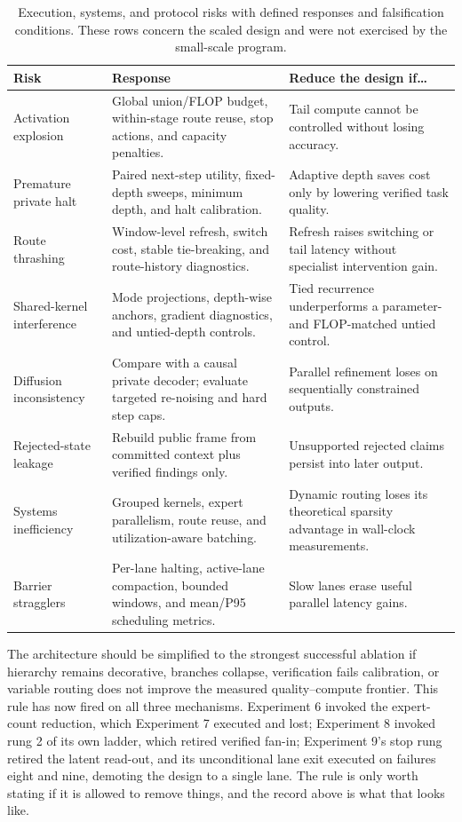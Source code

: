 \documentclass[10pt,a4paper]{article}
\begin{document}
\begin{table}[htbp]
\caption{Execution, systems, and protocol risks with defined responses and
falsification conditions. These rows concern the scaled design and were not
exercised by the small-scale program.}
\label{tab:failuremodessys}
\centering\footnotesize
\begin{tabularx}{\textwidth}{@{}>{\raggedright\arraybackslash}p{}XX@{}}
\toprule
\textbf{Risk} & \textbf{Response} & \textbf{Reduce the design if\ldots} \\
\midrule
Activation explosion & Global union/FLOP budget, within-stage route reuse, stop actions, and capacity penalties. & Tail compute cannot be controlled without losing accuracy. \\
Premature private halt & Paired next-step utility, fixed-depth sweeps, minimum depth, and halt calibration. & Adaptive depth saves cost only by lowering verified task quality. \\
Route thrashing & Window-level refresh, switch cost, stable tie-breaking, and route-history diagnostics. & Refresh raises switching or tail latency without specialist intervention gain. \\
Shared-kernel interference & Mode projections, depth-wise anchors, gradient diagnostics, and untied-depth controls. & Tied recurrence underperforms a parameter- and FLOP-matched untied control. \\
Diffusion inconsistency & Compare with a causal private decoder; evaluate targeted re-noising and hard step caps. & Parallel refinement loses on sequentially constrained outputs. \\
Rejected-state leakage & Rebuild public frame from committed context plus verified findings only. & Unsupported rejected claims persist into later output. \\
Systems inefficiency & Grouped kernels, expert parallelism, route reuse, and utilization-aware batching. & Dynamic routing loses its theoretical sparsity advantage in wall-clock measurements. \\
Barrier stragglers & Per-lane halting, active-lane compaction, bounded windows, and mean/P95 scheduling metrics. & Slow lanes erase useful parallel latency gains. \\
\bottomrule
\end{tabularx}
\end{table}

The architecture should be simplified to the strongest successful ablation if
hierarchy remains decorative, branches collapse, verification fails
calibration, or variable routing does not improve the measured
quality--compute frontier. This rule has now fired on all three mechanisms.
Experiment 6 invoked the expert-count reduction, which Experiment 7 executed and lost;
Experiment 8 invoked rung 2 of its own ladder, which retired verified fan-in;
Experiment 9's stop rung retired the latent read-out, and its unconditional lane
exit executed on failures eight and nine, demoting the design to a single
lane. The rule is only worth stating if it is allowed to remove things, and
the record above is what that looks like.
\end{document}
